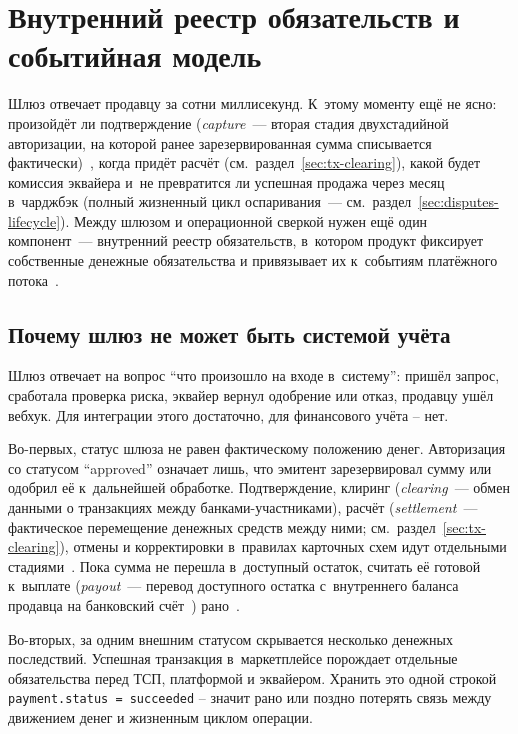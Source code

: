 
\chapter{Внутренний реестр обязательств и событийная модель}\label{ch:internal-ledger}

Шлюз отвечает продавцу за сотни миллисекунд. К~этому моменту
ещё не ясно: произойдёт ли подтверждение (\textit{capture}~--- вторая
стадия двухстадийной авторизации, на которой ранее зарезервированная
сумма списывается фактически)~\cite{stripe-manual-capture,adyen-glossary},
когда придёт расчёт (см.~раздел~\ref{sec:tx-clearing}), какой будет
комиссия эквайера и~не превратится ли успешная продажа через месяц
в~чарджбэк (полный жизненный цикл оспаривания~---
см.~раздел~\ref{sec:disputes-lifecycle}). Между шлюзом
и операционной сверкой нужен ещё один компонент~--- внутренний реестр
обязательств, в~котором продукт фиксирует собственные денежные
обязательства и привязывает их к~событиям платёжного
потока~\cite{visa-core-rules,mc-tpr,stripe-manual-capture}.

\section{Почему шлюз не может быть системой учёта}\label{sec:ledger-why}

Шлюз отвечает на вопрос \enquote{что произошло на входе в~систему}:
пришёл запрос, сработала проверка риска, эквайер вернул одобрение
или отказ, продавцу ушёл вебхук. Для интеграции этого достаточно,
для финансового учёта -- нет.

Во-первых, статус шлюза не равен фактическому положению денег. Авторизация
со статусом \enquote{approved} означает лишь, что эмитент зарезервировал
сумму или одобрил её к~дальнейшей обработке. Подтверждение, клиринг
(\textit{clearing}~--- обмен данными о транзакциях между банками-участниками),
расчёт (\textit{settlement}~--- фактическое перемещение денежных средств
между ними; см.~раздел~\ref{sec:tx-clearing}), отмены и корректировки
в~правилах карточных схем идут отдельными стадиями~\cite{mc-switching-services}.
Пока сумма не перешла в~доступный остаток, считать её готовой
к~выплате (\textit{payout}~--- перевод доступного остатка с~внутреннего
баланса продавца на банковский счёт~\cite{stripe-payouts})
рано~\cite{visa-core-rules,mc-tpr,stripe-manual-capture,stripe-balances}.

Во-вторых, за одним внешним статусом скрывается несколько денежных
последствий. Успешная транзакция в~маркетплейсе порождает отдельные
обязательства перед ТСП, платформой и эквайером. Хранить это одной
строкой \texttt{payment.status = succeeded} -- значит рано или поздно
потерять связь между движением денег и жизненным циклом операции.

